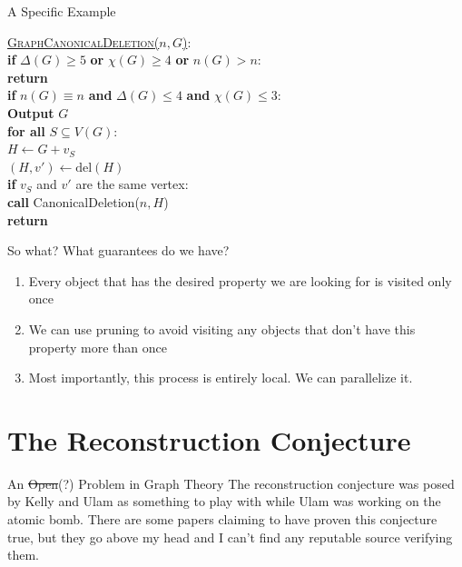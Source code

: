 \documentclass[aspectratio=169]{beamer}
\begin{document}
\begin{frame}{A Specific Example}
    \begin{nalgo}
    \underline{\textsc{GraphCanonicalDeletion}($n, G$)}:
    \\\label{}  \textbf{if} $\Delta(G) \geq 5$ \textbf{or} $\chi(G) \geq 4$ \textbf{or} $n(G) > n$: \+
    \\\label{}      \textbf{return} \-
    \\\label{}  \textbf{if} $n(G) \equiv n$ \textbf{and} $\Delta(G) \leq 4$ \textbf{and} $\chi(G) \leq 3$: \+
    \\\label{}      \textbf{Output} $G$ \-
    \\\label{}  \textbf{for all} $S \subseteq V(G)$: \+
    \\\label{}      $H \leftarrow G + v_S$ \hspace{20.5pt}
    \\\label{}      $(H, v') \leftarrow {\mathrm{del}}(H)$ 
    \\\label{}      \textbf{if} $v_S$ and $v'$ are the same vertex: \+
    \\\label{}          \textbf{call} CanonicalDeletion($n, H$) \-\-
    \\\label{} \textbf{return}
    \end{nalgo}
\end{frame}

\begin{frame}{So what?}
    What guarantees do we have? \pause
    \begin{enumerate}
        \item Every object that has the desired property we are looking for is visited only once \pause
        \item We can use pruning to avoid visiting any objects that don't have this property more than once \pause
        \item Most importantly, this process is entirely local. We can parallelize it. 
    \end{enumerate}
\end{frame}

\section{The Reconstruction Conjecture}
\frame{\sectionpage}

\begin{frame}{An \sout{Open}(?) Problem in Graph Theory}
    The reconstruction conjecture was posed by Kelly and Ulam as something to play with while Ulam was working on the atomic bomb. There are some papers claiming to have proven this conjecture true, but they go above my head and I can't find any reputable source verifying them. 
\end{frame}
\end{document}
